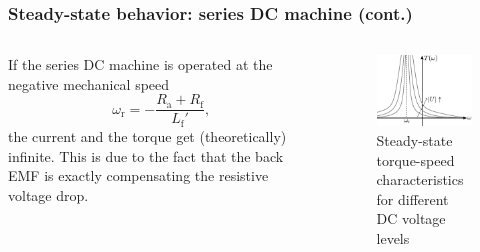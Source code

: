 \begin{frame}
	\frametitle{Steady-state behavior: series DC machine (cont.)}
	\begin{columns}
		\begin{column}{0.55\textwidth}
		If the series DC machine is operated at the negative mechanical speed
		\begin{equation}
			\omega_\mathrm{r} = -\frac{R_\mathrm{a} + R_\mathrm{f}}{L_\mathrm{f}'},
	   \end{equation}
	   the current and the torque get (theoretically) infinite. This is due to the fact that the back EMF is exactly compensating the resistive voltage drop.

\end{column}
\hfill
\begin{column}{0.45\textwidth}
	\begin{figure}
		\centering
		\includegraphics[scale=1.1]{fig/lec03/Series_DC_machine_torque_speed.pdf}
		\caption{Steady-state torque-speed characteristics for different DC voltage levels}
		\label{fig:Series_DC_machine_torque_speed}
\end{figure}
\end{column}
\end{columns}
\end{frame}


